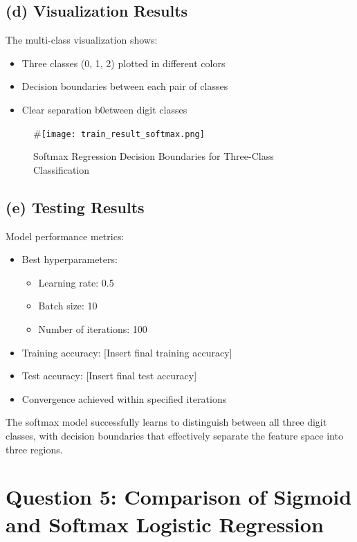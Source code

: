 \documentclass{article}
\begin{document}
\subsection*{(d) Visualization Results}
The multi-class visualization shows:
\begin{itemize}
    \item Three classes (0, 1, 2) plotted in different colors
    \item Decision boundaries between each pair of classes
    \item Clear separation b0etween digit classes
\end{itemize}

\begin{figure}[H]
    \centering
    #\texttt{[image: train\_result\_softmax.png]}
    \caption{Softmax Regression Decision Boundaries for Three-Class Classification}
    \label{fig:softmax_results}
\end{figure}

\subsection*{(e) Testing Results}
Model performance metrics:
\begin{itemize}
    \item Best hyperparameters:
    \begin{itemize}
        \item Learning rate: 0.5
        \item Batch size: 10
        \item Number of iterations: 100
    \end{itemize}
    \item Training accuracy: [Insert final training accuracy]
    \item Test accuracy: [Insert final test accuracy]
    \item Convergence achieved within specified iterations
\end{itemize}

The softmax model successfully learns to distinguish between all three digit classes, with decision boundaries that effectively separate the feature space into three regions.

\section*{Question 5: Comparison of Sigmoid and Softmax Logistic Regression}
\end{document}
